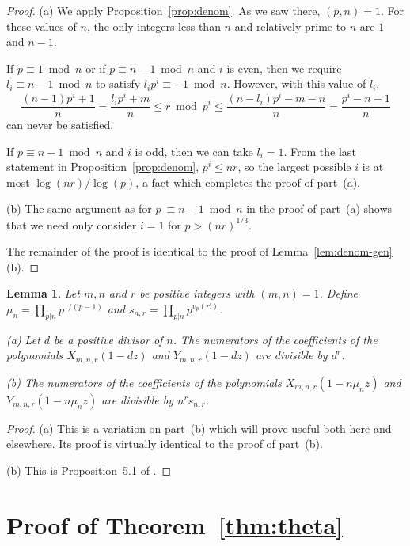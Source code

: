 \documentclass{jT}
\newtheorem{lemma}[theorem]{Lemma}
\theoremstyle{definition}
\begin{document}
\begin{proof}
(a) We apply Proposition~\ref{prop:denom}. As we saw there, $(p,n)=1$.
For these values of $n$, the only integers less than $n$ and relatively prime
to $n$ are $1$ and $n-1$.

If $p \equiv 1 \bmod n$ or if $p \equiv n-1 \bmod n$ and $i$ is even,
then we require $l_{i} \equiv n-1 \bmod n$ to satisfy $l_{i}p^{i} \equiv -1 
\bmod n$. However, with this value of $l_{i}$,
\begin{displaymath}
\frac{(n-1)p^{i}+1}{n} = \frac{l_{i}p^{i}+m}{n}
\leq r \bmod p^{i}
\leq \frac{(n-l_{i})p^{i}-m-n}{n} = \frac{p^{i}-n-1}{n}
\end{displaymath}
can never be satisfied.

If $p \equiv n-1 \bmod n$ and $i$ is odd, then we can take $l_{i}=1$.
From the last statement in Proposition~\ref{prop:denom}, $p^{i} \leq nr$,
so the largest possible $i$ is at most $\log(nr)/\log(p)$, a fact which
completes the proof of part~(a).

(b) The same argument as for $p\ \equiv n-1 \bmod n$ in the proof
of part~(a) shows that we need only consider $i=1$ for $p > (nr)^{1/3}$.

The remainder of the proof is identical to the proof of Lemma~\ref{lem:denom-gen}(b).
\end{proof}

\begin{lemma}
\label{lem:numer}
Let $m,n$ and $r$ be positive integers with $(m,n)=1$. 
Define $\mu_{n} = \prod_{p|n} p^{1/(p-1)}$ and $s_{n,r} 
= \prod_{p|n} p^{v_{p}(r!)}$.  

\noindent
{\rm (a)} Let $d$ be a positive divisor of $n$.
The numerators of the coefficients of the polynomials 
$X_{m,n,r}(1-dz)$ and $Y_{m,n,r}(1-dz)$ are divisible by $d^{r}$. 

\noindent
{\rm (b)} The numerators of the coefficients of the polynomials 
$X_{m,n,r} \left( 1 - n\mu_{n}z \right)$ and 
$Y_{m,n,r} \left( 1-n\mu_{n}z \right)$ are divisible by $n^{r} s_{n,r}$. 
\end{lemma}

\begin{proof}
(a) This is a variation on part~(b) which will prove useful both 
here and elsewhere. Its proof is virtually identical to the proof of part~(b).

(b) This is Proposition~5.1 of \cite{Chud}.  
\end{proof}

\section{Proof of Theorem~\ref{thm:theta}}
\end{document}
